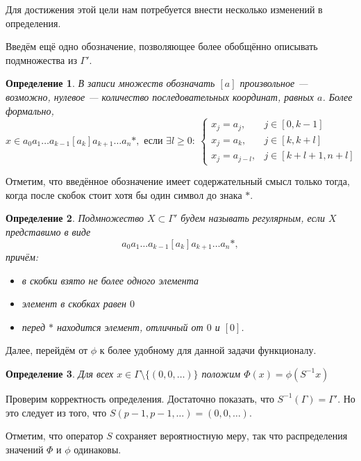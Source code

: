 \documentclass[14pt, a4paper, russian]{report}
\newtheorem{definition}{\indent Определение}
\begin{document}
Для достижения этой цели нам потребуется внести несколько изменений в определения. 

Введём ещё одно обозначение, позволяющее более обобщённо описывать подмножества из $\Gamma'$.
\begin{definition}
В записи множеств обозначать $[a]$ произвольное --- возможно, нулевое --- количество последовательных координат, равных $a$. Более формально,
$$ x \in a_0 a_1 \ldots a_{k-1} [a_k] a_{k+1} \ldots a_n * ,\text{ если } \exists l \ge 0:\ 
\begin{cases}
x_j = a_j, & j \in [0, k-1] \\
x_j = a_k, & j \in [k, k+l] \\
x_j = a_{j-l}, & j \in [k+l+1, n+l]
\end{cases}$$
\end{definition}
Отметим, что введённое обозначение имеет содержательный смысл только тогда, когда после скобок стоит хотя бы один символ до знака $*$. 
\begin{definition}
Подмножество $X \subset \Gamma'$ будем называть регулярным, если $X$ представимо в виде \begin{equation}\label{eq:regular}
a_0 a_1 \ldots a_{k-1} [a_k] a_{k+1} \ldots a_n *,
\end{equation} причём:
\begin{itemize}
\item в скобки взято не более одного элемента
\item элемент в скобках равен $0$
\item перед $*$ находится элемент, отличный от $0$ и $[0]$.
\end{itemize}
\end{definition}

Далее, перейдём от $\phi$ к более удобному для данной задачи функционалу.
\begin{definition}\label{Phi}
Для всех $x \in \Gamma \setminus \{(0,0,\ldots)\}$ положим $\Phi(x)=\phi(S^{-1}x)$
\end{definition}
Проверим корректность определения. Достаточно показать, что $S^{-1}(\Gamma) = \Gamma'$. Но это следует из того, что $S(p-1,p-1,\ldots) = (0,0,\ldots)$.

Отметим, что оператор $S$ сохраняет вероятностную меру, так что распределения значений $\Phi$ и $\phi$ одинаковы.
\end{document}
